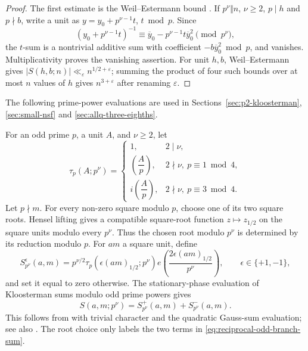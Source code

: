 \documentclass[12pt, a4paper]{amsart}
\numberwithin{equation}{section}
\newcommand{\e}{e}
\newcommand{\ep}{\varepsilon}
\renewcommand{\bar}[1]{\overline{#1}}
\renewcommand{\ge}{\geqslant}
\theoremstyle{plain}
\begin{document}
\begin{proof}
The first estimate is the Weil--Estermann bound \cite[Corollary 11.12, (11.16)]{IK}. If $p^\nu\Vert n$, $\nu\ge2$, $p\mid h$ and $p\nmid b$, write a unit as $y=y_0+p^{\nu-1}t$, $t\bmod p$. Since
$$
(y_0+p^{\nu-1}t)^{-1}\equiv \bar y_0-p^{\nu-1}t\bar y_0^2\pmod{p^\nu},
$$
the $t$-sum is a nontrivial additive sum with coefficient $-b\bar y_0^2\bmod p$, and vanishes. Multiplicativity proves the vanishing assertion. For unit $h,b$, Weil--Estermann gives $|S(h,b;n)|\ll_\ep n^{1/2+\ep}$; summing the product of four such bounds over at most $n$ values of $h$ gives $n^{3+\ep}$ after renaming $\ep$.
\end{proof}

The following prime-power evaluations are used in Sections~\ref{sec:p2-kloosterman}, \ref{sec:small-nsf} and \ref{sec:allq-three-eighths}.

For an odd prime $p$, a unit $A$, and $\nu\ge2$, let
\begin{equation}\label{eq:reciprocal-gauss-sign}
 \tau_p(A;p^\nu)=
 \begin{cases}
  1,&2\mid\nu,\\
  \left(\dfrac Ap\right),&2\nmid\nu,\ p\equiv1\bmod4,\\
  i\left(\dfrac Ap\right),&2\nmid\nu,\ p\equiv3\bmod4.
 \end{cases}
\end{equation}
Let $p\nmid m$. For every non-zero square modulo $p$, choose one of its two square roots. Hensel lifting gives a compatible square-root function $z\mapsto z_{1/2}$ on the square units modulo every $p^\nu$. Thus the chosen root modulo $p^\nu$ is determined by its reduction modulo $p$. For $am$ a square unit, define
\begin{equation}\label{eq:reciprocal-odd-branch}
 S_{p^\nu}^{\epsilon}(a,m)
 =p^{\nu/2}\tau_p
   \left(\epsilon(am)_{1/2};p^\nu\right)
  \e\left(\frac{2\epsilon(am)_{1/2}}{p^\nu}\right),
 \qquad \epsilon\in\{+1,-1\},
\end{equation}
and set it equal to zero otherwise. The stationary-phase evaluation of Kloosterman sums modulo odd prime powers gives
\begin{equation}\label{eq:reciprocal-odd-branch-sum}
 S(a,m;p^\nu)=S_{p^\nu}^{+}(a,m)+S_{p^\nu}^{-}(a,m).
\end{equation}
This follows from \cite[Lemmas~12.2 and~12.3]{IK} with trivial character and the quadratic Gauss-sum evaluation; see also \cite[Lemma~22]{BM2015}. The root choice only labels the two terms in \eqref{eq:reciprocal-odd-branch-sum}.
\end{document}
